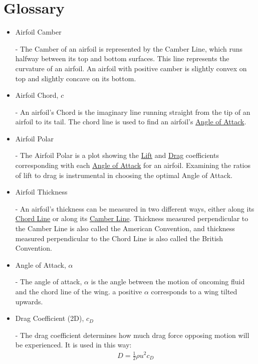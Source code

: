 \documentclass{article}
\begin{document}
\section{Glossary}
\begin{itemize}
	
	\item \hypertarget{Camber}{Airfoil Camber} - The Camber of an airfoil is represented by the Camber Line, which runs halfway between its top and bottom surfaces. This line represents the curvature of an airfoil. An airfoil with positive camber is slightly convex on top and slightly concave on its bottom.
	
	\item \hypertarget{c}{Airfoil Chord, $c$} - An airfoil's Chord is the imaginary line running straight from the tip of an airfoil to its tail. The chord line is used to find an airfoil's \hyperlink{alpha}{Angle of Attack}.

	\item \hypertarget{AP}{Airfoil Polar} - The Airfoil Polar is a plot showing the  \hyperlink{CL}{Lift} and  \hyperlink{CD}{Drag} coefficients corresponding with each \hyperlink{alpha}{Angle of Attack} for an airfoil. Examining the ratios of lift to drag is instrumental in choosing the optimal Angle of Attack.
	
	\item \hypertarget{Th}{Airfoil Thickness} - An airfoil's thickness can be measured in two different ways, either along its \hyperlink{c}{Chord Line} or along its \hyperlink{Camber}{Camber Line}. Thickness measured perpendicular to the Camber Line is also called the American Convention, and thickness measured perpendicular to the Chord Line is also called the British Convention.
		
	\item \hypertarget{alpha}{Angle of Attack, $\alpha$} - The angle of attack, $\alpha$ is the angle between the motion of oncoming fluid and the chord line of the wing. a positive $\alpha$ corresponds to a wing tilted upwards.

	\item \hypertarget{CD}{Drag Coefficient (2D), $c_{D}$} - The drag coefficient determines how much drag force opposing motion will be experienced. It is used in this way: 
		\begin{equation} \label{eq:2}
		\begin{aligned}
        			D = \frac{1}{2} \rho u^{2} c_{D}
	    	\end{aligned}
		\end{equation}
	

\end{itemize}
\end{document}
